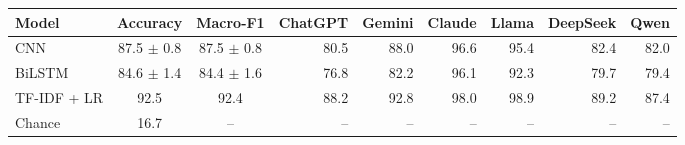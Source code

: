 \begin{tabular}{lccrrrrrr}
\toprule
Model & Accuracy & Macro-F1 & ChatGPT & Gemini & Claude & Llama & DeepSeek & Qwen \\
\midrule
CNN & 87.5 $\pm$ 0.8 & 87.5 $\pm$ 0.8 & 80.5 & 88.0 & 96.6 & 95.4 & 82.4 & 82.0 \\
BiLSTM & 84.6 $\pm$ 1.4 & 84.4 $\pm$ 1.6 & 76.8 & 82.2 & 96.1 & 92.3 & 79.7 & 79.4 \\
\midrule
TF-IDF + LR & 92.5 & 92.4 & 88.2 & 92.8 & 98.0 & 98.9 & 89.2 & 87.4 \\
Chance & 16.7 & -- & -- & -- & -- & -- & -- & -- \\
\bottomrule
\end{tabular}
